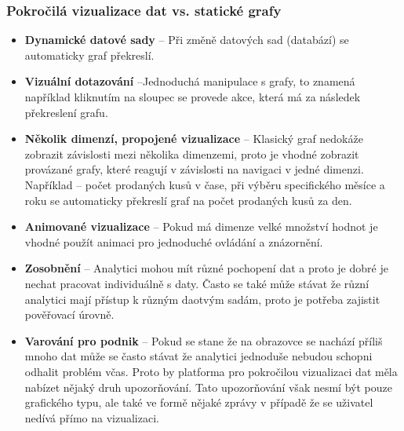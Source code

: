 \subsubsection{Pokročilá vizualizace dat vs. statické grafy}
\begin{itemize}
  \item \textbf{Dynamické datové sady} -- Při změně datových sad (databází) se automaticky graf překreslí.
  \item \textbf{Vizuální dotazování} --Jednoduchá manipulace s grafy, to znamená například kliknutím na sloupec se provede akce, která má za následek překreslení grafu.
  \item \textbf{Několik dimenzí, propojené vizualizace} -- Klasický graf nedokáže zobrazit závislosti mezi několika dimenzemi, proto je vhodné zobrazit provázané grafy, které reagují v závislosti na navigaci v jedné dimenzi. Například -- počet prodaných kusů v čase, při výběru specifického měsíce a roku se automaticky překreslí graf na počet prodaných kusů za den.
  \item \textbf{Animované vizualizace} -- Pokud má dimenze velké množství hodnot je vhodné použít animaci pro jednoduché ovládání a znázornění.
  \item \textbf{Zosobnění} -- Analytici mohou mít různé pochopení dat a proto je dobré je nechat pracovat individuálně s daty. Často se také může stávat že různí analytici mají přístup k různým daotvým sadám, proto je potřeba zajistit pověřovací úrovně.
  \item \textbf{Varování pro podnik} -- Pokud se stane že na obrazovce se nachází příliš mnoho dat může se často stávat že analytici jednoduše nebudou schopni odhalit problém včas. Proto by platforma pro pokročilou vizualizaci dat měla nabízet nějaký druh upozorňování. Tato upozorňování však nesmí být pouze grafického typu, ale také ve formě nějaké zprávy v případě že se uživatel nedívá přímo na vizualizaci. \cite{advanced-data-vizualization-platforms}
\end{itemize}

